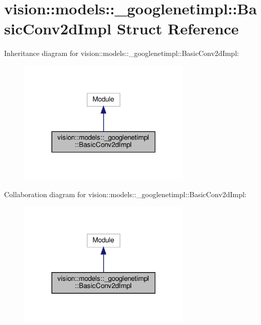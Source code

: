 \hypertarget{structvision_1_1models_1_1__googlenetimpl_1_1BasicConv2dImpl}{}\section{vision\+:\+:models\+:\+:\+\_\+googlenetimpl\+:\+:Basic\+Conv2d\+Impl Struct Reference}
\label{structvision_1_1models_1_1__googlenetimpl_1_1BasicConv2dImpl}


Inheritance diagram for vision\+:\+:models\+:\+:\+\_\+googlenetimpl\+:\+:Basic\+Conv2d\+Impl\+:
\nopagebreak
\begin{figure}[H]
\begin{center}
\leavevmode
\includegraphics[width=231pt]{structvision_1_1models_1_1__googlenetimpl_1_1BasicConv2dImpl__inherit__graph}
\end{center}
\end{figure}


Collaboration diagram for vision\+:\+:models\+:\+:\+\_\+googlenetimpl\+:\+:Basic\+Conv2d\+Impl\+:
\nopagebreak
\begin{figure}[H]
\begin{center}
\leavevmode
\includegraphics[width=231pt]{structvision_1_1models_1_1__googlenetimpl_1_1BasicConv2dImpl__coll__graph}
\end{center}
\end{figure}
